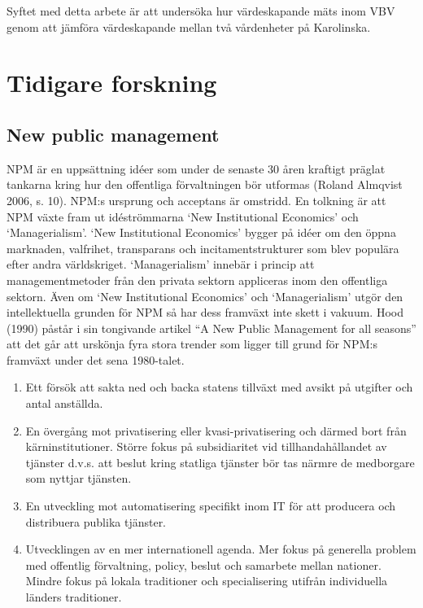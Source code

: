 Syftet med detta arbete är att undersöka hur värdeskapande mäts inom VBV genom att jämföra värdeskapande mellan två vårdenheter på Karolinska.

\section{Tidigare forskning}

\subsection{New public management}

NPM är en uppsättning idéer som under de senaste 30 åren kraftigt präglat tankarna kring hur den offentliga förvaltningen bör utformas (Roland Almqvist 2006, s. 10). NPM:s ursprung och acceptans är omstridd. En tolkning är att NPM växte fram ut idéströmmarna ‘New Institutional Economics’ och ‘Managerialism’. ‘New Institutional Economics’ bygger på idéer om den öppna marknaden, valfrihet, transparans och incitamentstrukturer som blev populära efter andra världskriget. ‘Managerialism’ innebär i princip att managementmetoder från den privata sektorn appliceras inom den offentliga sektorn. Även om ‘New Institutional Economics’ och ‘Managerialism’ utgör den intellektuella grunden för NPM så har dess framväxt inte skett i vakuum. Hood (1990) påstår i sin tongivande artikel “A New Public Management for all seasons” att det går att urskönja fyra stora trender som ligger till grund för NPM:s framväxt under det sena 1980-talet.

\begin{enumerate}
  \item Ett försök att sakta ned och backa statens tillväxt med avsikt på utgifter och antal anställda.
  \item En övergång mot privatisering eller kvasi-privatisering och därmed bort från kärninstitutioner. Större fokus på subsidiaritet vid tillhandahållandet av tjänster d.v.s. att beslut kring statliga tjänster bör tas närmre de medborgare som nyttjar tjänsten.
  \item En utveckling mot automatisering specifikt inom IT för att producera och distribuera publika tjänster.
  \item Utvecklingen av en mer internationell agenda. Mer fokus på generella problem med offentlig förvaltning, policy, beslut och samarbete mellan nationer. Mindre fokus på lokala traditioner och specialisering utifrån individuella länders traditioner.
\end{enumerate}

